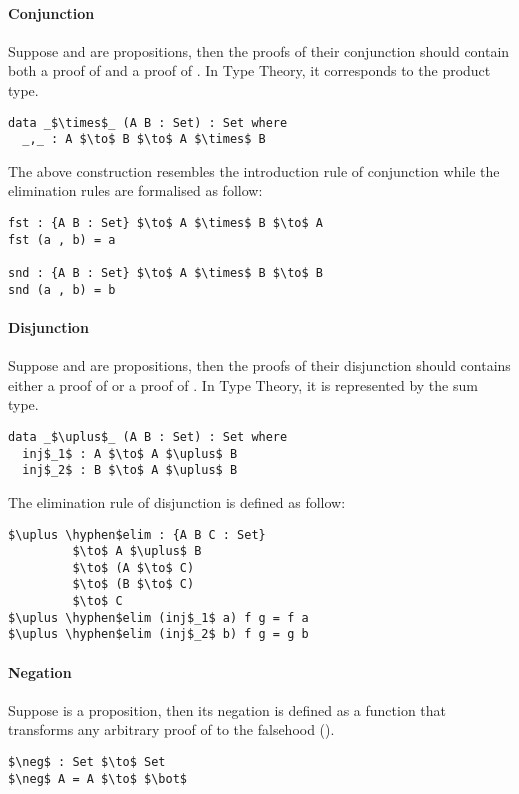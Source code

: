 \paragraph{Conjunction} Suppose  and  are propositions, then the
proofs of their conjunction  should contain both a proof of  and a proof
of . In Type Theory, it corresponds
to the product type. 
\begin{lstlisting}[mathescape=true,xleftmargin=.3\textwidth]
data _$\times$_ (A B : Set) : Set where
  _,_ : A $\to$ B $\to$ A $\times$ B
\end{lstlisting} 

\par The above construction resembles the introduction rule of
conjunction while the elimination rules are formalised as follow:
\begin{lstlisting}[mathescape=true,xleftmargin=.3\textwidth]
fst : {A B : Set} $\to$ A $\times$ B $\to$ A
fst (a , b) = a

snd : {A B : Set} $\to$ A $\times$ B $\to$ B
snd (a , b) = b
\end{lstlisting} 


\paragraph{Disjunction} Suppose  and  are propositions, then the
proofs of their disjunction  should contains either a proof of  or a
proof of . In Type Theory, it is represented by the sum type. 
\begin{lstlisting}[mathescape=true,xleftmargin=.3\textwidth]
data _$\uplus$_ (A B : Set) : Set where
  inj$_1$ : A $\to$ A $\uplus$ B
  inj$_2$ : B $\to$ A $\uplus$ B
\end{lstlisting} 

\par The elimination rule of disjunction is defined as follow: 
\begin{lstlisting}[mathescape=true,xleftmargin=.3\textwidth]
$\uplus \hyphen$elim : {A B C : Set} 
         $\to$ A $\uplus$ B 
         $\to$ (A $\to$ C) 
         $\to$ (B $\to$ C) 
         $\to$ C
$\uplus \hyphen$elim (inj$_1$ a) f g = f a
$\uplus \hyphen$elim (inj$_2$ b) f g = g b
\end{lstlisting} 

\paragraph{Negation} Suppose  is a proposition, then its negation is
defined as a function that transforms any arbitrary proof of  to
the falsehood (\mb{\bot}). 
\begin{lstlisting}[mathescape=true,xleftmargin=.3\textwidth]
$\neg$ : Set $\to$ Set
$\neg$ A = A $\to$ $\bot$
\end{lstlisting} 


